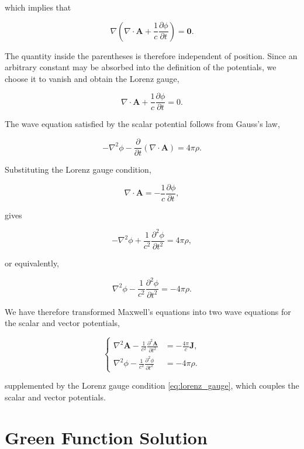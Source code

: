 \documentclass[12pt]{article}
\begin{document}
which implies that

\[
\nabla
\left(
\nabla\cdot\mathbf A
+
\frac{1}{c}
\frac{\partial\phi}{\partial t}
\right)
=
\mathbf0.
\]

The quantity inside the parentheses is therefore independent of position.
Since an arbitrary constant may be absorbed into the definition of the
potentials, we choose it to vanish and obtain the Lorenz gauge,

\begin{equation}
\nabla\cdot\mathbf A
+
\frac{1}{c}
\frac{\partial\phi}{\partial t}
=
0.
\label{eq:lorenz_gauge}
\end{equation}

The wave equation satisfied by the scalar potential follows from Gauss's law,

\[
-\nabla^2\phi
-
\frac{\partial}{\partial t}
\left(
\nabla\cdot\mathbf A
\right)
=
4\pi\rho.
\]

Substituting the Lorenz gauge condition,

\[
\nabla\cdot\mathbf A
=
-
\frac{1}{c}
\frac{\partial\phi}{\partial t},
\]

gives

\[
-\nabla^2\phi
+
\frac{1}{c^2}
\frac{\partial^2\phi}{\partial t^2}
=
4\pi\rho,
\]

or equivalently,

\begin{equation}
\nabla^2\phi
-
\frac{1}{c^2}
\frac{\partial^2\phi}{\partial t^2}
=
-4\pi\rho.
\label{eq:wave_scalar_potential}
\end{equation}

We have therefore transformed Maxwell's equations into two wave
equations for the scalar and vector potentials,

\begin{equation}
\left\{
\begin{aligned}
\nabla^2\mathbf A
-
\frac{1}{c^2}
\frac{\partial^2\mathbf A}{\partial t^2}
&=
-\frac{4\pi}{c}\mathbf J,
\\[0.6em]
\nabla^2\phi
-
\frac{1}{c^2}
\frac{\partial^2\phi}{\partial t^2}
&=
-4\pi\rho.
\end{aligned}
\right.
\label{eq:potential_wave_equations}
\end{equation}

supplemented by the Lorenz gauge
condition \eqref{eq:lorenz_gauge}, which couples the scalar and vector
potentials.

\section{Green Function Solution}
\end{document}
